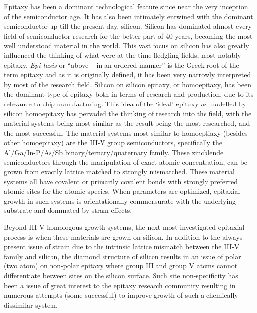 Epitaxy has been a dominant technological feature since near the very inception of the semiconductor age.
It has also been intimately entwined with the dominant semiconductor up till the present day, silicon.
Silicon has dominated almost every field of semiconductor research for the better part of 40 years, becoming the most well understood material in the world.
This vast focus on silicon has also greatly influenced the thinking of what were at the time fledgling fields, most notably epitaxy.
\emph{Epi-taxis} or ``above -- in an ordered manner'' is the Greek root of the term epitaxy and as it is originally defined, it has been very narrowly interpreted by most of the research field.
Silicon on silicon epitaxy, or homoepitaxy, has been the dominant type of epitaxy both in terms of research and production, due to its relevance to chip manufacturing.
This idea of the `ideal' epitaxy as modelled by silicon homoepitaxy has pervaded the thinking of research into the field, with the material systems being most similar as the result being the most researched, and the most successful.
The material systems most similar to homoeptiaxy (besides other homoepitaxy) are the III-V group semiconductors, specifically the Al/Ga/In-P/As/Sb binary/ternary/quaternary family.
These zincblende semiconductors through the manipulation of exact atomic concentration, can be grown from exactly lattice matched to strongly mismatched. These material systems all have covalent or primarily covalent bonds with strongly preferred atomic sites for the atomic species.
When parameters are optimized, epitaxial growth in such systems is orientationally commensurate with the underlying substrate and dominated by strain effects.

Beyond III-V homologous growth systems, the next most investigated epitaxial process is when these materials are grown on silicon.
In addition to the always-present issue of strain due to the intrinsic lattice mismatch between the III-V family and silicon, the diamond structure of silicon results in an issue of polar (two atom) on non-polar epitaxy\cite{polar-on-non-polar} where group III and group V atoms cannot differentiate between sites on the silicon surface.
Such site non-specificity has been a issue of great interest to the epitaxy research community resulting in numerous attempts (some successful)\cite{polar-on-non-polar-review} to improve growth of such a chemically dissimilar system.


